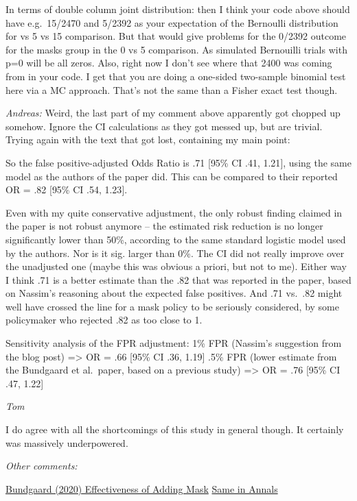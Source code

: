\documentclass[
]{book}
\begin{document}
In terms of double column joint distribution: then I think your code above should have e.g.~15/2470 and 5/2392 as your expectation of the Bernoulli distribution for vs 5 vs 15 comparison. But that would give problems for the 0/2392 outcome for the masks group in the 0 vs 5 comparison. As simulated Bernouilli trials with p=0 will be all zeros. Also, right now I don't see where that 2400 was coming from in your code. I get that you are doing a one-sided two-sample binomial test here via a MC approach. That's not the same than a Fisher exact test though.

\emph{Andreas:}
Weird, the last part of my comment above apparently got chopped up somehow. Ignore the CI calculations as they got messed up, but are trivial. Trying again with the text that got lost, containing my main point:

So the false positive-adjusted Odds Ratio is .71 {[}95\% CI .41, 1.21{]}, using the same model as the authors of the paper did. This can be compared to their reported OR = .82 {[}95\% CI .54, 1.23{]}.

Even with my quite conservative adjustment, the only robust finding claimed in the paper is not robust anymore -- the estimated risk reduction is no longer significantly lower than 50\%, according to the same standard logistic model used by the authors. Nor is it sig. larger than 0\%. The CI did not really improve over the unadjusted one (maybe this was obvious a priori, but not to me). Either way I think .71 is a better estimate than the .82 that was reported in the paper, based on Nassim's reasoning about the expected false positives. And .71 vs.~.82 might well have crossed the line for a mask policy to be seriously considered, by some policymaker who rejected .82 as too close to 1.

Sensitivity analysis of the FPR adjustment:
1\% FPR (Nassim's suggestion from the blog post) =\textgreater{} OR = .66 {[}95\% CI .36, 1.19{]}
.5\% FPR (lower estimate from the Bundgaard et al.~paper, based on a previous study) =\textgreater{} OR = .76 {[}95\% CI .47, 1.22{]}

\emph{Tom}

I do agree with all the shortcomings of this study in general though. It certainly was massively underpowered.

\emph{Other comments:}

\href{https://pubmed.ncbi.nlm.nih.gov/33205991/}{Bundgaard (2020) Effectiveness of Adding Mask}
\href{https://www.acpjournals.org/doi/10.7326/M20-6817}{Same in Annals}
\end{document}
